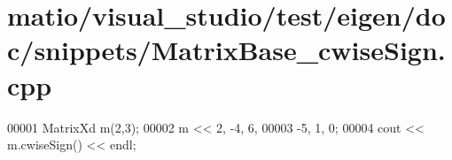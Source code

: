 \hypertarget{matio_2visual__studio_2test_2eigen_2doc_2snippets_2_matrix_base__cwise_sign_8cpp_source}{}\section{matio/visual\+\_\+studio/test/eigen/doc/snippets/\+Matrix\+Base\+\_\+cwise\+Sign.cpp}
\label{matio_2visual__studio_2test_2eigen_2doc_2snippets_2_matrix_base__cwise_sign_8cpp_source}

\begin{DoxyCode}
00001 MatrixXd m(2,3);
00002 m <<  2, -4, 6,
00003      -5,  1, 0;
00004 cout << m.cwiseSign() << endl;
\end{DoxyCode}
